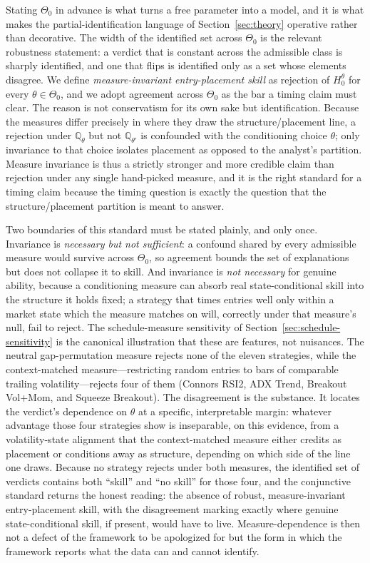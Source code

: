 Stating $\Theta_0$ in advance is what turns a free parameter into a model, and it is what
makes the partial-identification language of Section~\ref{sec:theory} operative rather
than decorative. The width of the identified set across $\Theta_0$ is the relevant
robustness statement: a verdict that is constant across the admissible class is sharply
identified, and one that flips is identified only as a set whose elements disagree. We
define \emph{measure-invariant entry-placement skill} as rejection of $H_0^\theta$ for
every $\theta\in\Theta_0$, and we adopt agreement across $\Theta_0$ as the bar a timing
claim must clear. The reason is not conservatism for its own sake but identification.
Because the measures differ precisely in where they draw the structure/placement line, a
rejection under $\mathbb{Q}_\theta$ but not $\mathbb{Q}_{\theta'}$ is confounded with the
conditioning choice $\theta$; only invariance to that choice isolates placement as
opposed to the analyst's partition. Measure invariance is thus a strictly stronger and
more credible claim than rejection under any single hand-picked measure, and it is the
right standard for a timing claim because the timing question is exactly the question that
the structure/placement partition is meant to answer.

Two boundaries of this standard must be stated plainly, and only once. Invariance is
\emph{necessary but not sufficient}: a confound shared by every admissible measure would
survive across $\Theta_0$, so agreement bounds the set of explanations but does not
collapse it to skill. And invariance is \emph{not necessary} for genuine ability, because
a conditioning measure can absorb real state-conditional skill into the structure it holds
fixed; a strategy that times entries well only within a market state which the measure
matches on will, correctly under that measure's null, fail to reject. The
schedule-measure sensitivity of Section~\ref{sec:schedule-sensitivity} is the canonical
illustration that these are features, not nuisances. The neutral gap-permutation measure
rejects none of the eleven strategies, while the context-matched measure---restricting
random entries to bars of comparable trailing volatility---rejects four of them
(Connors RSI2, ADX Trend, Breakout Vol+Mom, and Squeeze Breakout). The disagreement is
the substance. It locates the verdict's dependence on $\theta$ at a specific, interpretable
margin: whatever advantage those four strategies show is inseparable, on this evidence,
from a volatility-state alignment that the context-matched measure either credits as
placement or conditions away as structure, depending on which side of the line one draws.
Because no strategy rejects under both measures, the identified set of verdicts contains
both ``skill'' and ``no skill'' for those four, and the conjunctive standard returns the
honest reading: the absence of robust, measure-invariant entry-placement skill, with the
disagreement marking exactly where genuine state-conditional skill, if present, would have
to live. Measure-dependence is then not a defect of the framework to be apologized for but
the form in which the framework reports what the data can and cannot identify.

